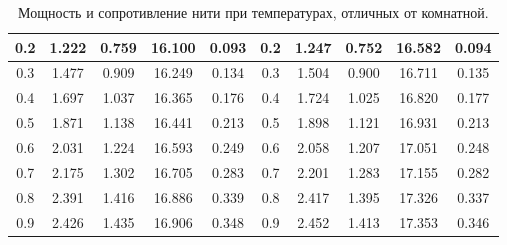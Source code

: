 \documentclass[a4paper, 12pt]{article}%
\begin{document}
\begin{table}[H]
\begin{tabular}{|ccccc|ccccc|}
			\multicolumn{1}{|c|}{0.2}   & \multicolumn{1}{c|}{1.222}   & \multicolumn{1}{c|}{0.759}     & \multicolumn{1}{c|}{16.100}  & 0.093      & \multicolumn{1}{c|}{0.2}   & \multicolumn{1}{c|}{1.247}   & \multicolumn{1}{c|}{0.752}     & \multicolumn{1}{c|}{16.582}  & 0.094      \\ \hline
			\multicolumn{1}{|c|}{0.3}   & \multicolumn{1}{c|}{1.477}   & \multicolumn{1}{c|}{0.909}     & \multicolumn{1}{c|}{16.249}  & 0.134      & \multicolumn{1}{c|}{0.3}   & \multicolumn{1}{c|}{1.504}   & \multicolumn{1}{c|}{0.900}     & \multicolumn{1}{c|}{16.711}  & 0.135      \\ \hline
			\multicolumn{1}{|c|}{0.4}   & \multicolumn{1}{c|}{1.697}   & \multicolumn{1}{c|}{1.037}     & \multicolumn{1}{c|}{16.365}  & 0.176      & \multicolumn{1}{c|}{0.4}   & \multicolumn{1}{c|}{1.724}   & \multicolumn{1}{c|}{1.025}     & \multicolumn{1}{c|}{16.820}  & 0.177      \\ \hline
			\multicolumn{1}{|c|}{0.5}   & \multicolumn{1}{c|}{1.871}   & \multicolumn{1}{c|}{1.138}     & \multicolumn{1}{c|}{16.441}  & 0.213      & \multicolumn{1}{c|}{0.5}   & \multicolumn{1}{c|}{1.898}   & \multicolumn{1}{c|}{1.121}     & \multicolumn{1}{c|}{16.931}  & 0.213      \\ \hline
			\multicolumn{1}{|c|}{0.6}   & \multicolumn{1}{c|}{2.031}   & \multicolumn{1}{c|}{1.224}     & \multicolumn{1}{c|}{16.593}  & 0.249      & \multicolumn{1}{c|}{0.6}   & \multicolumn{1}{c|}{2.058}   & \multicolumn{1}{c|}{1.207}     & \multicolumn{1}{c|}{17.051}  & 0.248      \\ \hline
			\multicolumn{1}{|c|}{0.7}   & \multicolumn{1}{c|}{2.175}   & \multicolumn{1}{c|}{1.302}     & \multicolumn{1}{c|}{16.705}  & 0.283      & \multicolumn{1}{c|}{0.7}   & \multicolumn{1}{c|}{2.201}   & \multicolumn{1}{c|}{1.283}     & \multicolumn{1}{c|}{17.155}  & 0.282      \\ \hline
			\multicolumn{1}{|c|}{0.8}   & \multicolumn{1}{c|}{2.391}   & \multicolumn{1}{c|}{1.416}     & \multicolumn{1}{c|}{16.886}  & 0.339      & \multicolumn{1}{c|}{0.8}   & \multicolumn{1}{c|}{2.417}   & \multicolumn{1}{c|}{1.395}     & \multicolumn{1}{c|}{17.326}  & 0.337      \\ \hline
			\multicolumn{1}{|c|}{0.9}   & \multicolumn{1}{c|}{2.426}   & \multicolumn{1}{c|}{1.435}     & \multicolumn{1}{c|}{16.906}  & 0.348      & \multicolumn{1}{c|}{0.9}   & \multicolumn{1}{c|}{2.452}   & \multicolumn{1}{c|}{1.413}     & \multicolumn{1}{c|}{17.353}  & 0.346      \\ \hline
		\end{tabular}
			\caption{Мощность и сопротивление нити при температурах, отличных от комнатной.}
	\end{table}
\end{document}
